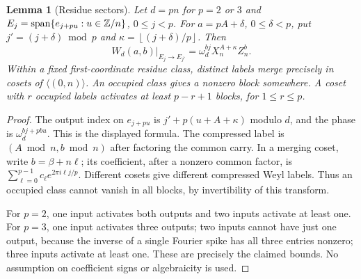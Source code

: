 \documentclass[11pt,a4paper]{article}
\newtheorem{lemma}[theorem]{Lemma}
\theoremstyle{remark}\newtheorem{remark}[theorem]{Remark}
\newcommand{\fl}[1]{\left\lfloor #1\right\rfloor}
\begin{document}
\begin{lemma}[Residue sectors]\label{lem:residue}
Let $d=pn$ for $p=2$ or $3$ and
$E_j=\operatorname{span}\{e_{j+pu}:u\in\mathbb Z/n\}$, $0\le j<p$.
For $a=pA+\delta$, $0\le\delta<p$, put
$j'=(j+\delta)\bmod p$ and $\kappa=\fl{(j+\delta)/p}$. Then
\[
 W_d(a,b)|_{E_j\to E_{j'}}
       =\omega_d^{bj}X_n^{A+\kappa}Z_n^b .
\]
Within a fixed first-coordinate residue class, distinct labels merge
precisely in cosets of $\langle(0,n)\rangle$.
An occupied class gives a nonzero block somewhere. A coset with $r$
occupied labels activates at least $p-r+1$ blocks, for $1\le r\le p$.
\end{lemma}
\begin{proof}
The output index on $e_{j+pu}$ is $j'+p(u+A+\kappa)$ modulo $d$,
and the phase is $\omega_d^{bj+ pbu}$. This is the displayed formula.
The compressed label is $(A\bmod n,b\bmod n)$ after factoring the common
carry. In a merging coset, write $b=\beta+n\ell$; its coefficient, after
a nonzero common factor, is
$\sum_{\ell=0}^{p-1}c_\ell e^{2\pi i\ell j/p}$.
Different cosets give different compressed Weyl labels. Thus an occupied
class cannot vanish in all blocks, by invertibility of this transform.

For $p=2$, one input activates both outputs and two inputs activate at
least one. For $p=3$, one input activates three outputs; two inputs cannot
have just one output, because the inverse of a single Fourier spike
has all three entries nonzero; three inputs activate at least one.
These are precisely the claimed bounds. No assumption on coefficient
signs or algebraicity is used.
\end{proof}
\end{document}
